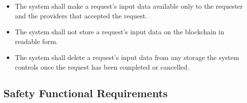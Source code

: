 \documentclass[12pt]{article}
\newcounter{reqnum} %
\begin{document}
\noindent \begin{itemize}

\item[FR\refstepcounter{reqnum}\thereqnum \label{FR_InputAccessRestriction}:] The system shall make a request's input data available only to the requester and the providers that accepted the request.

\item[FR\refstepcounter{reqnum}\thereqnum \label{FR_InputNotOnChain}:] The system shall not store a request's input data on the blockchain in readable form.

\item[FR\refstepcounter{reqnum}\thereqnum \label{FR_InputDeletion}:] The system shall delete a request's input data from any storage the system controls once the request has been completed or cancelled.

\end{itemize}

\subsection{Safety Functional Requirements}
\end{document}
